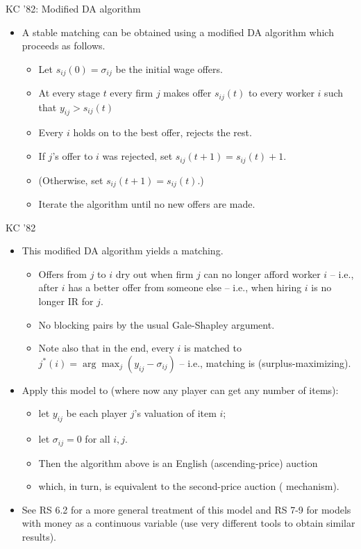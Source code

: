 \documentclass[english,10pt
,aspectratio=169
]{beamer}
\begin{document}
\begin{frame}{KC '82: Modified DA algorithm}
\begin{itemize}
	\item A stable matching can be obtained using a modified DA algorithm which proceeds as follows.
	\begin{itemize}
		\item Let $s_{ij}(0) = \sigma_{ij}$ be the initial wage offers.
		\item At every stage $t$ every firm $j$ makes offer $s_{ij}(t)$ to every worker $i$ such that $y_{ij} > s_{ij}(t)$
		\item Every $i$ holds on to the best offer, rejects the rest.
		\item If $j$'s offer to $i$ was rejected, set $s_{ij}(t+1) = s_{ij}(t) + 1$.
		\item (Otherwise, set $s_{ij}(t+1) = s_{ij}(t)$.)
		\item Iterate the algorithm until no new offers are made.
	\end{itemize}
\end{itemize}
\end{frame}


\begin{frame}{KC '82}
\begin{itemize}
	\item This modified DA algorithm yields a  matching.
	\begin{itemize}
		\item Offers from $j$ to $i$ dry out when firm $j$ can no longer afford worker $i$ -- i.e., after $i$ has a better offer from someone else -- i.e., when hiring $i$ is no longer IR for $j$.
		\item No blocking pairs by the usual Gale-Shapley argument.
		\item Note also that in the end, every $i$ is matched to $j^*(i) = \arg \max_j (y_{ij}-\sigma_{ij})$ -- i.e., matching is  (surplus-maximizing).
	\end{itemize}
	\item Apply this model to  (where now any player can get any number of items): 
	\begin{itemize}
		\item let $y_{ij}$ be each player $j$'s valuation of item $i$;
		\item let $\sigma_{ij} = 0$ for all $i,j$.
		\item Then the algorithm above is an English (ascending-price) auction
		\item which, in turn, is equivalent to the second-price auction ( mechanism).
	\end{itemize}
	\item See RS 6.2 for a more general treatment of this model and RS 7-9 for models with money as a continuous variable (use very different tools to obtain similar results).
\end{itemize}
\end{frame}
\end{document}

